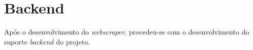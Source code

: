 
\section{Backend}
Após o desenvolvimento do \textit{webscraper}, procedeu-se com o desenvolvimento do suporte \textit{backend} do projeto.

















\newpage


